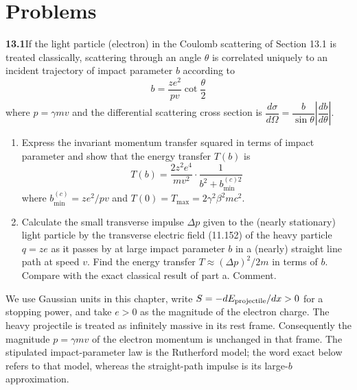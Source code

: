 
\section*{Problems}

\par\bigskip
\noindent\textbf{13.1}\quad If the light particle (electron) in the Coulomb scattering of Section 13.1 is treated classically, scattering through an angle $\theta$ is correlated uniquely to an incident trajectory of impact parameter $b$ according to
\[
b=\frac{ze^{2}}{pv}\cot\frac{\theta}{2}
\]
where $p=\gamma mv$ and the differential scattering cross section is $\dfrac{d\sigma}{d\Omega}=\dfrac{b}{\sin\theta}\left|\dfrac{db}{d\theta}\right|$.
\begin{enumerate}
\item[(a)] Express the invariant momentum transfer squared in terms of impact parameter and show that the energy transfer $T(b)$ is
\[
T(b)=\frac{2z^{2}e^{4}}{mv^{2}}\cdot\frac{1}{b^{2}+b_{\min}^{(c)2}}
\]
where $b_{\min}^{(c)}=ze^{2}/pv$ and $T(0)=T_{\max}=2\gamma^{2}\beta^{2}mc^{2}$.
\item[(b)] Calculate the small transverse impulse $\Delta p$ given to the (nearly stationary) light particle by the transverse electric field (11.152) of the heavy particle $q=ze$ as it passes by at large impact parameter $b$ in a (nearly) straight line path at speed $v$. Find the energy transfer $T\approx(\Delta p)^{2}/2m$ in terms of $b$. Compare with the exact classical result of part a. Comment.
\end{enumerate}
\solution
We use Gaussian units in this chapter, write $S=-dE_{\rm projectile}/dx>0$
for a stopping power, and take $e>0$ as the magnitude of the electron charge.
The heavy projectile is treated as infinitely massive in its rest frame.
Consequently the magnitude $p=\gamma mv$ of the electron momentum is
unchanged in that frame. The stipulated impact-parameter law is the
Rutherford model; the word exact below refers to that model, whereas
the straight-path impulse is its large-$b$ approximation.

